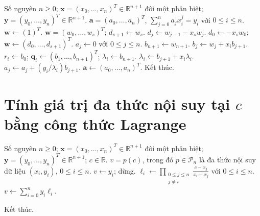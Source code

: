 \documentclass[12pt,a4paper,oneside]{book}
\numberwithin{algorithm}{chapter}
\theoremstyle{definition}
\newcommand{\R}{\mathbb{R}}
\begin{document}
\begin{algorithm}[H]
\caption{Tạo hệ số nội suy Lagrange bằng Horner -- chi tiết}
\label{alg:lagrange-coefficients-detailed}
\small
\begin{algorithmic}[1]
\Require Số nguyên $n\geq0$; $\boldsymbol x=(x_0,\ldots,x_n)^T\in\R^{n+1}$ đôi một phân biệt; $\boldsymbol y=(y_0,\ldots,y_n)^T\in\R^{n+1}$.
\Ensure $\boldsymbol a=(a_0,\ldots,a_n)^T$, $\sum_{j=0}^{n}a_jx_i^j=y_i$ với $0\leq i\leq n$.
\State $\boldsymbol w\gets(1)^T$.
  \State $\boldsymbol w=(w_0,\ldots,w_s)^T$; $d_{s+1}\gets w_s$.
    \State $d_j\gets w_{j-1}-x_sw_j$.
  \EndFor
\Statex
  \State $d_0\gets-x_sw_0$; $\boldsymbol w\gets(d_0,\ldots,d_{s+1})^T$.
\EndFor
\Statex
\State $a_j\gets0$ với $0\leq j\leq n$.
  \State $b_{n+1}\gets w_{n+1}$.
    \State $b_j\gets w_j+x_ib_{j+1}$.
  \EndFor
\Statex
  \State $r_i\gets b_0$; $\boldsymbol q_i\gets(b_1,\ldots,b_{n+1})^T$; $\lambda_i\gets b_{n+1}$.
    \State $\lambda_i\gets b_{j+1}+x_i\lambda_i$.
  \EndFor
\Statex
    \State $a_j\gets a_j+(y_i/\lambda_i)b_{j+1}$.
  \EndFor
\EndFor
\Statex
\State $\boldsymbol a\gets(a_0,\ldots,a_n)^T$.
\State Kết thúc.
\end{algorithmic}
\end{algorithm}

\section{Tính giá trị đa thức nội suy tại \texorpdfstring{$c$}{c} bằng công thức Lagrange}
\begin{algorithm}[H]
\caption{Tính giá trị đa thức nội suy tại $c$ bằng công thức Lagrange -- sơ lược}
\label{alg:lagrange-evaluate-short}
\begin{algorithmic}[1]
\Require Số nguyên $n\geq0$; $\boldsymbol x=(x_0,\ldots,x_n)^T\in\R^{n+1}$ đôi một phân biệt; $\boldsymbol y=(y_0,\ldots,y_n)^T\in\R^{n+1}$; $c\in\R$.
\Ensure $v=p(c)$, trong đó $p\in\mathcal P_n$ là đa thức nội suy dữ liệu $(x_i,y_i)$, $0\leq i\leq n$.
  \State $v\gets y_i$; dừng.
\EndIf
\Statex
\State $\displaystyle\ell_i\gets\prod_{\substack{0\leq j\leq n\\j\ne i}}\frac{c-x_j}{x_i-x_j}$ với $0\leq i\leq n$.
\State $\displaystyle v\gets\sum_{i=0}^{n}y_i\ell_i$.

\State Kết thúc.
\end{algorithmic}
\end{algorithm}
\end{document}

